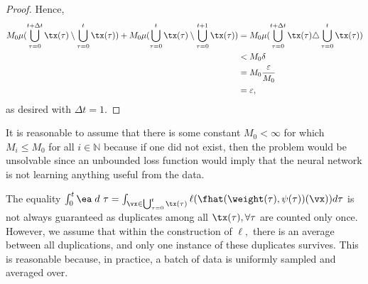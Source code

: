 \begin{proof}
    Hence,
    \begin{align*}
        M_0 \mu(\bigcup_{\tau = 0}^{t+\Delta t} \tx(\tau)\setminus \bigcup_{\tau = 0}^{t} \tx(\tau)) + M_0\mu(\bigcup_{\tau = 0}^{t} \tx(\tau)\setminus \bigcup_{\tau = 0}^{t+1} \tx(\tau)) & = M_0\mu(\bigcup_{\tau = 0}^{t+\Delta t} \tx(\tau)\triangle \bigcup_{\tau = 0}^{t} \tx(\tau))\\
        & < M_0\delta\\
        & = M_0 \frac{\varepsilon}{M_0}\\
        & = \varepsilon,
    \end{align*}
    as desired with $\Delta t = 1.$
\end{proof}

\begin{remark}\label{boundedremark}
    It is reasonable to assume that there is some constant $M_0<\infty$ for which $M_i\leq M_0$ 
    for all $i\in \mathbb{N}$ because 
    if one did not exist, then the problem would be unsolvable since
    an unbounded loss function would imply that 
    the neural network is not learning anything useful from the data. 
\end{remark}

\begin{remark}\label{unionremark}
    The  equality  $\int_0^t \ea \;  d~\tau  = \int_{\vx\in \bigcup_{\tau=0}^t\tx(\tau)}       \ell(\fhat(\weight(\tau),\psi(\tau))( \vx ) )d\tau $ is not always guaranteed as duplicates among all $\tx(\tau), \forall \tau$  are counted only once. However, we assume that within the construction of $\ell,$ there is an average between all duplications, and only one instance of these duplicates survives. This is reasonable because, in practice, a batch of data is uniformly sampled and averaged over.
\end{remark}

